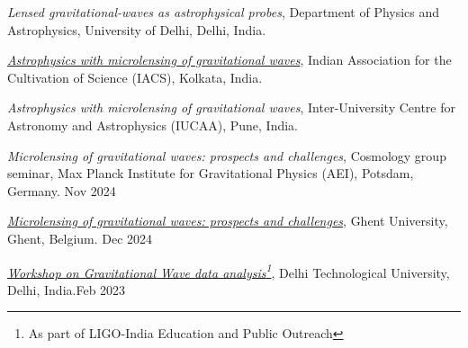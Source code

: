 \begin{itemize}[noitemsep]
{
    \item \textit{Lensed gravitational-waves as astrophysical probes}, Department of Physics and Astrophysics, University of Delhi, Delhi, India. \hspace{16 em}{Feb 2026}
     
    \item \textit{\href{https://iacs.res.in/modules/seminar/images/fileupload_05-08-255792.pdf}{Astrophysics with microlensing of gravitational waves}}, Indian Association for the Cultivation of Science (IACS), Kolkata, India. \hspace{16 em}{Aug 2025}
    
    \item \textit{Astrophysics with microlensing of gravitational waves}, Inter-University Centre for Astronomy and Astrophysics (IUCAA), Pune, India. \hspace{13.47 em}{July 2025}
    
    \item \textit{Microlensing of gravitational waves: prospects and challenges}, Cosmology group seminar, Max Planck Institute for Gravitational Physics (AEI), Potsdam, Germany. \hfill{Nov 2024}

    \item \textit{\href{https://eppg.ugent.be/index.php/2024-2025/}{Microlensing of gravitational waves: prospects and challenges}}, Ghent University, Ghent, Belgium. \hfill{Dec 2024}
    
    \item \href{https://github.com/singhmukesh1729/EPO_DTU2023}{\textit{Workshop on Gravitational Wave data analysis\footnote{As part of LIGO-India Education and Public Outreach}}}, Delhi Technological University, Delhi, India.\hfill{Feb 2023}
}\end{itemize}
